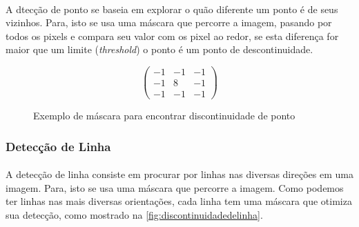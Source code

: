 \paragraph*{}A dtecção de ponto se baseia em explorar o quão diferente um ponto é de seus vizinhos. Para, isto se usa uma máscara que percorre a imagem, pasando por todos os pixels e compara seu valor com os pixel ao redor, se esta diferença for maior que um limite (\textit{threshold}) o ponto é um ponto de descontinuidade.

\begin{figure}[h]
\[ \left( \begin{array}{ccc}
-1 & -1 & -1 \\
-1 &  8 & -1 \\
-1 & -1 & -1 \end{array} \right)\] 
\caption{Exemplo de máscara para encontrar discontinuidade de ponto}
\end{figure}

\subsubsection{Detecção de Linha}
\paragraph*{}A detecção de linha consiste em procurar por linhas nas diversas direções em uma imagem. Para, isto se usa uma máscara que percorre a imagem. Como podemos ter linhas nas mais diversas orientações, cada linha tem uma máscara que otimiza sua detecção, como mostrado na \ref{fig:discontinuidadedelinha}.

